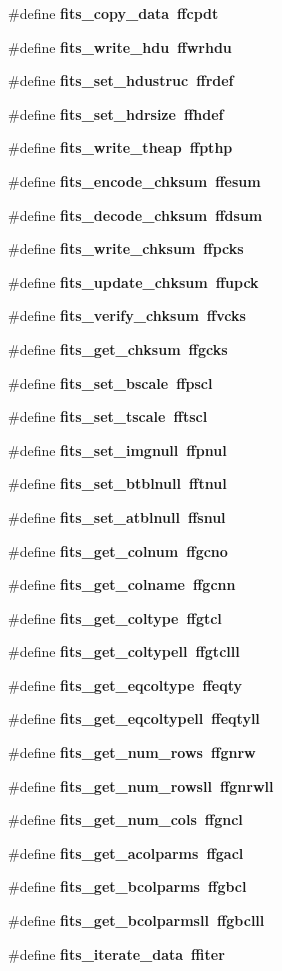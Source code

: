 \begin{CompactItemize}
\#define \bf{fits\_\-copy\_\-data}~ffcpdt
\item 
\#define \bf{fits\_\-write\_\-hdu}~ffwrhdu
\item 
\#define \bf{fits\_\-set\_\-hdustruc}~ffrdef
\item 
\#define \bf{fits\_\-set\_\-hdrsize}~ffhdef
\item 
\#define \bf{fits\_\-write\_\-theap}~ffpthp
\item 
\#define \bf{fits\_\-encode\_\-chksum}~ffesum
\item 
\#define \bf{fits\_\-decode\_\-chksum}~ffdsum
\item 
\#define \bf{fits\_\-write\_\-chksum}~ffpcks
\item 
\#define \bf{fits\_\-update\_\-chksum}~ffupck
\item 
\#define \bf{fits\_\-verify\_\-chksum}~ffvcks
\item 
\#define \bf{fits\_\-get\_\-chksum}~ffgcks
\item 
\#define \bf{fits\_\-set\_\-bscale}~ffpscl
\item 
\#define \bf{fits\_\-set\_\-tscale}~fftscl
\item 
\#define \bf{fits\_\-set\_\-imgnull}~ffpnul
\item 
\#define \bf{fits\_\-set\_\-btblnull}~fftnul
\item 
\#define \bf{fits\_\-set\_\-atblnull}~ffsnul
\item 
\#define \bf{fits\_\-get\_\-colnum}~ffgcno
\item 
\#define \bf{fits\_\-get\_\-colname}~ffgcnn
\item 
\#define \bf{fits\_\-get\_\-coltype}~ffgtcl
\item 
\#define \bf{fits\_\-get\_\-coltypell}~ffgtclll
\item 
\#define \bf{fits\_\-get\_\-eqcoltype}~ffeqty
\item 
\#define \bf{fits\_\-get\_\-eqcoltypell}~ffeqtyll
\item 
\#define \bf{fits\_\-get\_\-num\_\-rows}~ffgnrw
\item 
\#define \bf{fits\_\-get\_\-num\_\-rowsll}~ffgnrwll
\item 
\#define \bf{fits\_\-get\_\-num\_\-cols}~ffgncl
\item 
\#define \bf{fits\_\-get\_\-acolparms}~ffgacl
\item 
\#define \bf{fits\_\-get\_\-bcolparms}~ffgbcl
\item 
\#define \bf{fits\_\-get\_\-bcolparmsll}~ffgbclll
\item 
\#define \bf{fits\_\-iterate\_\-data}~ffiter

\end{CompactItemize}
